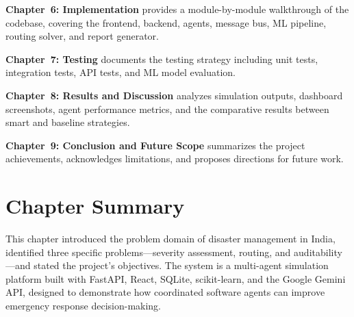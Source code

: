 \textbf{Chapter~6: Implementation} provides a module-by-module walkthrough of the codebase, covering the frontend, backend, agents, message bus, ML pipeline, routing solver, and report generator.

\textbf{Chapter~7: Testing} documents the testing strategy including unit tests, integration tests, API tests, and ML model evaluation.

\textbf{Chapter~8: Results and Discussion} analyzes simulation outputs, dashboard screenshots, agent performance metrics, and the comparative results between smart and baseline strategies.

\textbf{Chapter~9: Conclusion and Future Scope} summarizes the project achievements, acknowledges limitations, and proposes directions for future work.

\section{Chapter Summary}
\label{sec:ch1_summary}

This chapter introduced the problem domain of disaster management in India, identified three specific problems---severity assessment, routing, and auditability---and stated the project's objectives. The system is a multi-agent simulation platform built with FastAPI, React, SQLite, scikit-learn, and the Google Gemini API, designed to demonstrate how coordinated software agents can improve emergency response decision-making.
